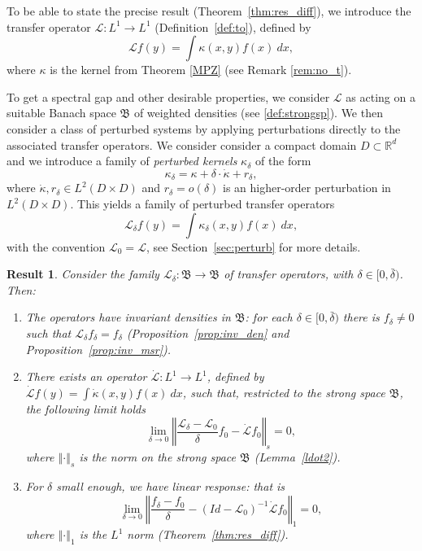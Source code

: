 \documentclass{amsart}
\newtheorem{maintheorem}{Result}
\newcommand\cL{{\mathcal L}}
\newcommand\fB{{\mathfrak B}}
\newcommand{\norm}[1]{\left\Vert#1\right\Vert}
\begin{document}
To be able to state the precise result (Theorem~\ref{thm:res_diff}), we introduce the transfer operator \(\cL: L^1 \to L^1\) (Definition~\ref{def:to}), defined by
$$
\cL f(y) = \int \kappa (x,y) f(x)\ dx,
$$
where  $\kappa$ is the kernel from Theorem \ref{MPZ} (see Remark \ref{rem:no_t}). 

To get a spectral gap and other desirable properties, we consider $\mathcal{L}$ as acting on  a suitable Banach space \(\fB\) of weighted densities (see \eqref{def:strongsp}).
 We then consider a class of perturbed systems by applying perturbations directly to the associated transfer operators. We consider consider a compact domain $D\subset \mathbb{R}^d$ and we  introduce  a family of \emph{perturbed kernels} $\kappa_\delta$ of the form
$$
\kappa_\delta = \kappa + \delta \cdot  \dot   \kappa + r_\delta,
$$
where $\dot \kappa, r_\delta \in L^2(D \times D)$ and $r_\delta = o (\delta)$ is an higher-order perturbation in $L^2(D \times D).$ This yields a family of perturbed transfer operators
 \begin{equation}\label{pert}
\cL_\delta f(y) = \int \kappa_{\delta }(x,y)  f(x)\ dx,
\end{equation}
with the convention \(\cL_0=\cL\), see Section~\ref{sec:perturb} for more details. 


\begin{maintheorem}

    Consider the family \(\cL_\delta:\fB\to\fB\) of transfer operators, with \(\delta\in [0,\bar\delta)\). Then:
    \begin{enumerate}
        \item The operators have invariant densities in \(\fB\): for each \(\delta\in [0,\bar\delta)\) there is \(f_\delta\neq 0\) such that \(\cL_\delta f_\delta=f_\delta\) (Proposition~\ref{prop:inv_den} and Proposition~\ref{prop:inv_msr}).
        \item There exists an operator \(\dot\cL:L^1\to L^1\), defined by \(\dot\cL f(y) = \int \dot\kappa(x,y) f(x)\ dx\), such that, restricted to the strong space \(\fB\), the following limit holds
        \[
        \lim\limits_{\delta\to 0} \norm{\frac{\cL_\delta-\cL_0}{\delta}f_0-\dot\cL f_0}_s=0,
        \]
        where \(\norm{\cdot}_s\) is the norm on the strong space \(\fB\) (Lemma~\ref{ldot2}).
        \item For \(\delta\) small enough, we have linear response: that is 
        \begin{equation}\label{res0}
        \lim\limits_{\delta\to 0}\norm{\frac{f_\delta-f_0}{\delta}-(Id-\cL_0)^{-1}\dot\cL f_0}_1=0,
        \end{equation}
        where \(\norm{\cdot}_1\) is the \(L^1\) norm (Theorem~\ref{thm:res_diff}).
    \end{enumerate}
    
\end{maintheorem}
\end{document}
